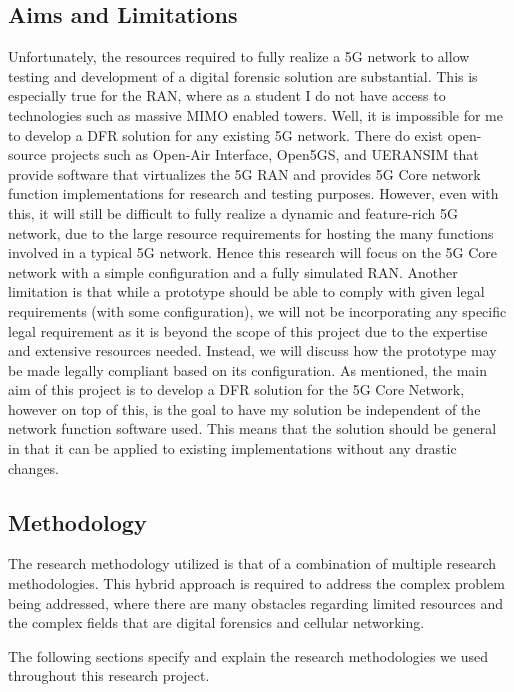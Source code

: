 \documentclass[final,1p,times,authoryear]{elsarticle}
\begin{document}
\subsection{Aims and Limitations}
\label{sub1sec5}
Unfortunately, the resources required to fully realize a 5G network to allow testing and development of a digital forensic solution are substantial. This is especially true for the RAN, where as a student I do not have access to technologies such as massive MIMO enabled towers. Well, it is impossible for me to develop a DFR solution for any existing 5G network. There do exist open-source projects such as Open-Air Interface, Open5GS, and UERANSIM that provide software that virtualizes the 5G RAN and provides 5G Core network function implementations for research and testing purposes. However, even with this, it will still be difficult to fully realize a dynamic and feature-rich 5G network, due to the large resource requirements for hosting the many functions involved in a typical 5G network. Hence this research will focus on the 5G Core network with a simple configuration and a fully simulated RAN. Another limitation is that while a prototype should be able to comply with given legal requirements (with some configuration), we will not be incorporating any specific legal requirement as it is beyond the scope of this project due to the expertise and extensive resources needed. Instead, we will discuss how the prototype may be made legally compliant based on its configuration. As mentioned, the main aim of this project is to develop a DFR solution for the 5G Core Network, however on top of this, is the goal to have my solution be independent of the network function software used. This means that the solution should be general in that it can be applied to existing implementations without any drastic changes.

\subsection{Methodology}
\label{sub1sec6}
The research methodology utilized is that of a combination of multiple research methodologies. This hybrid approach is required to address the complex problem being addressed, where there are many obstacles regarding limited resources and the complex fields that are digital forensics and cellular networking.

\vspace{1em}

The following sections specify and explain the research methodologies we used throughout this research project.
\end{document}
